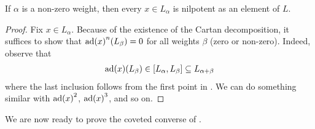 \begin{corollary}
    If $\alpha$ is a non-zero weight, then every $x \in L_{\alpha}$ is nilpotent as an element of $L$.
\end{corollary}
\begin{proof}
    Fix $x \in L_{\alpha}$. Because of the existence of the Cartan decomposition, it suffices to show that $\operatorname{ad}\!\left( x \right)^n\!\left( L_{\beta} \right) = 0$ for all weights $\beta$ (zero or non-zero). Indeed, observe that
    \begin{align*}
        \operatorname{ad}\!\left( x \right)\!\left( L_{\beta} \right) \in \left[ L_{\alpha}, L_{\beta} \right] \subseteq L_{\alpha + \beta}
    \end{align*}
    where the last inclusion follows from the first point in . We can do something similar with $\operatorname{ad}\!\left( x \right)^2$, $\operatorname{ad}\!\left( x \right)^3$, and so on. \sorry %
\end{proof}

We are now ready to prove the coveted converse of .

